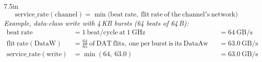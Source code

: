 \documentclass[border=8pt]{standalone}
\begin{document}
\begin{varwidth}{7.5in}
\[
  \mathrm{service\_rate}(\mathrm{channel})
  = \min\bigl(\mathrm{beat\ rate},\ \mathrm{flit\ rate\ of\ the\ channel's\ network}\bigr)
\]
\textit{Example, data-class write with 4\,KB bursts (64 beats of 64\,B):}
\begin{align*}
  \mathrm{beat\ rate} &= 1\ \mathrm{beat/cycle\ at\ 1\ GHz} && = 64\ \mathrm{GB/s}\\
  \mathrm{flit\ rate}(\mathrm{DataW}) &= \tfrac{64}{65}\ \mathrm{of\ DAT\ flits},\
    \mathrm{one\ per\ burst\ is\ its\ DataAw} && = 63.0\ \mathrm{GB/s}\\
  \mathrm{service\_rate}(\mathrm{write}) &= \min(64,\ 63.0) && = 63.0\ \mathrm{GB/s}
\end{align*}
\end{varwidth}
\end{document}
